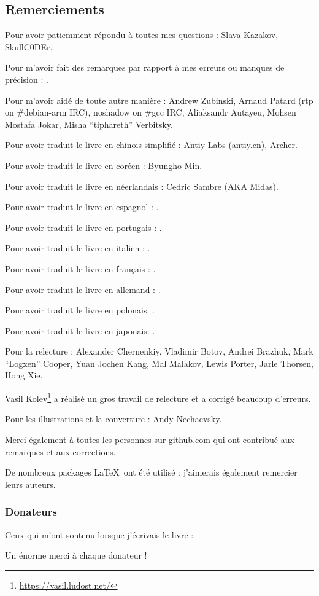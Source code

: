 \subsection*{Remerciements}

Pour avoir patiemment répondu à toutes mes questions : Slava  Kazakov, SkullC0DEr.

Pour m'avoir fait des remarques par rapport à mes erreurs ou manques de précision : \PeopleMistakesInaccuracies{}.

Pour m'avoir aidé de toute autre manière :
Andrew Zubinski,
Arnaud Patard (rtp on \#debian-arm IRC),
noshadow on \#gcc IRC,
Aliaksandr Autayeu,
Mohsen Mostafa Jokar,
Misha ``tiphareth'' Verbitsky.

Pour avoir traduit le livre en chinois simplifié :
Antiy Labs (\href{http://antiy.cn}{antiy.cn}), Archer.

Pour avoir traduit le livre en coréen : Byungho Min.

Pour avoir traduit le livre en néerlandais : Cedric Sambre (AKA Midas).

Pour avoir traduit le livre en espagnol : \PeopleSpanishTranslators{}.

Pour avoir traduit le livre en portugais : \PeoplePTBRTranslators{}.

Pour avoir traduit le livre en italien : \PeopleItalianTranslators{}.

Pour avoir traduit le livre en français : \PeopleFrenchTranslators{}.

Pour avoir traduit le livre en allemand : \PeopleGermanTranslators{}.

Pour avoir traduit le livre en polonais: \PeoplePolishTranslators{}.

Pour avoir traduit le livre en japonais: \PeopleJapaneseTranslators{}.

Pour la relecture :
Alexander  Chernenkiy,
Vladimir Botov,
Andrei Brazhuk,
Mark ``Logxen'' Cooper, Yuan Jochen Kang, Mal Malakov, Lewis Porter, Jarle Thorsen, Hong Xie.

Vasil Kolev\footnote{\url{https://vasil.ludost.net/}} a réalisé un gros travail de relecture et a corrigé beaucoup d'erreurs.

Pour les illustrations et la couverture : Andy Nechaevsky.

Merci également à toutes les personnes sur github.com qui ont contribué aux remarques et aux corrections\FNGithubContributors{}.

De nombreux packages \LaTeX\ ont été utilisé : j'aimerais également remercier leurs auteurs.

\subsubsection*{Donateurs}

Ceux qui m'ont sontenu lorsque j'écrivais le livre :



Un énorme merci à chaque donateur !
